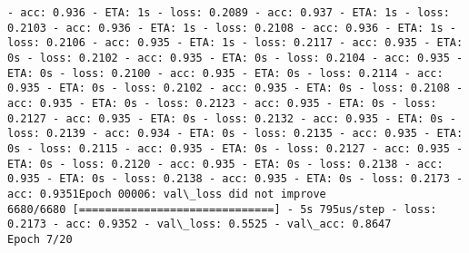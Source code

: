 \documentclass[11pt]{article}
\begin{document}
\begin{Verbatim}[commandchars=\\\{\}]
- acc: 0.936 - ETA: 1s - loss: 0.2089 - acc: 0.937 - ETA: 1s - loss: 0.2103 - acc: 0.936 - ETA: 1s - loss: 0.2108 - acc: 0.936 - ETA: 1s - loss: 0.2106 - acc: 0.935 - ETA: 1s - loss: 0.2117 - acc: 0.935 - ETA: 0s - loss: 0.2102 - acc: 0.935 - ETA: 0s - loss: 0.2104 - acc: 0.935 - ETA: 0s - loss: 0.2100 - acc: 0.935 - ETA: 0s - loss: 0.2114 - acc: 0.935 - ETA: 0s - loss: 0.2102 - acc: 0.935 - ETA: 0s - loss: 0.2108 - acc: 0.935 - ETA: 0s - loss: 0.2123 - acc: 0.935 - ETA: 0s - loss: 0.2127 - acc: 0.935 - ETA: 0s - loss: 0.2132 - acc: 0.935 - ETA: 0s - loss: 0.2139 - acc: 0.934 - ETA: 0s - loss: 0.2135 - acc: 0.935 - ETA: 0s - loss: 0.2115 - acc: 0.935 - ETA: 0s - loss: 0.2127 - acc: 0.935 - ETA: 0s - loss: 0.2120 - acc: 0.935 - ETA: 0s - loss: 0.2138 - acc: 0.935 - ETA: 0s - loss: 0.2138 - acc: 0.935 - ETA: 0s - loss: 0.2173 - acc: 0.9351Epoch 00006: val\_loss did not improve
6680/6680 [==============================] - 5s 795us/step - loss: 0.2173 - acc: 0.9352 - val\_loss: 0.5525 - val\_acc: 0.8647
Epoch 7/20

\end{Verbatim}
\end{document}
